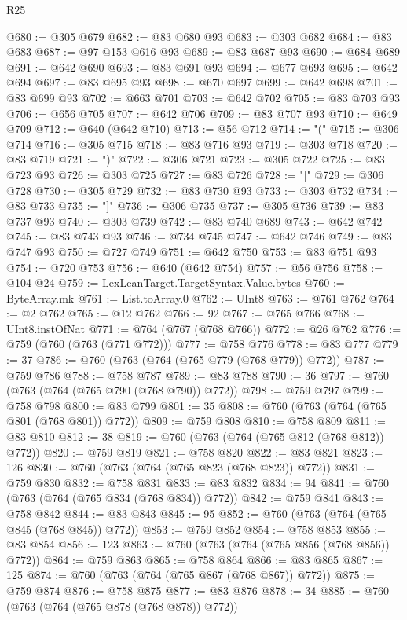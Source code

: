 \begin{lexlean}{R25}
\begin{coremodule}
@680 := @305 @679
@682 := @83 @680 @93
@683 := @303 @682
@684 := @83 @683
@687 := @97 @153 @616 @93
@689 := @83 @687 @93
@690 := @684 @689
@691 := @642 @690
@693 := @83 @691 @93
@694 := @677 @693
@695 := @642 @694
@697 := @83 @695 @93
@698 := @670 @697
@699 := @642 @698
@701 := @83 @699 @93
@702 := @663 @701
@703 := @642 @702
@705 := @83 @703 @93
@706 := @656 @705
@707 := @642 @706
@709 := @83 @707 @93
@710 := @649 @709
@712 := @640 (@642 @710)
@713 := @56 @712
@714 := "("
@715 := @306 @714
@716 := @305 @715
@718 := @83 @716 @93
@719 := @303 @718
@720 := @83 @719
@721 := ")"
@722 := @306 @721
@723 := @305 @722
@725 := @83 @723 @93
@726 := @303 @725
@727 := @83 @726
@728 := "["
@729 := @306 @728
@730 := @305 @729
@732 := @83 @730 @93
@733 := @303 @732
@734 := @83 @733
@735 := "]"
@736 := @306 @735
@737 := @305 @736
@739 := @83 @737 @93
@740 := @303 @739
@742 := @83 @740 @689
@743 := @642 @742
@745 := @83 @743 @93
@746 := @734 @745
@747 := @642 @746
@749 := @83 @747 @93
@750 := @727 @749
@751 := @642 @750
@753 := @83 @751 @93
@754 := @720 @753
@756 := @640 (@642 @754)
@757 := @56 @756
@758 := @104 @24
@759 := LexLeanTarget.TargetSyntax.Value.bytes
@760 := ByteArray.mk
@761 := List.toArray.{0}
@762 := UInt8
@763 := @761 @762
@764 := @2 @762
@765 := @12 @762
@766 := 92
@767 := @765 @766
@768 := UInt8.instOfNat
@771 := @764 (@767 (@768 @766))
@772 := @26 @762
@776 := @759 (@760 (@763 (@771 @772)))
@777 := @758 @776
@778 := @83 @777
@779 := 37
@786 := @760 (@763 (@764 (@765 @779 (@768 @779)) @772))
@787 := @759 @786
@788 := @758 @787
@789 := @83 @788
@790 := 36
@797 := @760 (@763 (@764 (@765 @790 (@768 @790)) @772))
@798 := @759 @797
@799 := @758 @798
@800 := @83 @799
@801 := 35
@808 := @760 (@763 (@764 (@765 @801 (@768 @801)) @772))
@809 := @759 @808
@810 := @758 @809
@811 := @83 @810
@812 := 38
@819 := @760 (@763 (@764 (@765 @812 (@768 @812)) @772))
@820 := @759 @819
@821 := @758 @820
@822 := @83 @821
@823 := 126
@830 := @760 (@763 (@764 (@765 @823 (@768 @823)) @772))
@831 := @759 @830
@832 := @758 @831
@833 := @83 @832
@834 := 94
@841 := @760 (@763 (@764 (@765 @834 (@768 @834)) @772))
@842 := @759 @841
@843 := @758 @842
@844 := @83 @843
@845 := 95
@852 := @760 (@763 (@764 (@765 @845 (@768 @845)) @772))
@853 := @759 @852
@854 := @758 @853
@855 := @83 @854
@856 := 123
@863 := @760 (@763 (@764 (@765 @856 (@768 @856)) @772))
@864 := @759 @863
@865 := @758 @864
@866 := @83 @865
@867 := 125
@874 := @760 (@763 (@764 (@765 @867 (@768 @867)) @772))
@875 := @759 @874
@876 := @758 @875
@877 := @83 @876
@878 := 34
@885 := @760 (@763 (@764 (@765 @878 (@768 @878)) @772))

\end{coremodule}
\end{lexlean}
